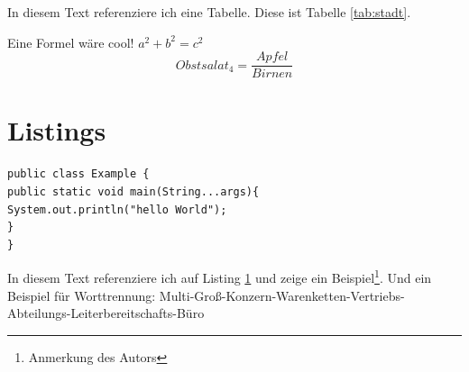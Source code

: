 \documentclass[]{scrreprt}
\begin{document}
In diesem Text referenziere ich eine Tabelle. Diese ist Tabelle \ref{tab:stadt}.

Eine Formel wäre cool! $a^2 + b^2 = c^2$
\[ Obstsalat_4 = \frac{Apfel}{Birnen} \]

\section{Listings}%
\label{meinCode}%
\begin{lstlisting}[caption=Example]
public class Example {
public static void main(String...args){
System.out.println("hello World");
}
}
\end{lstlisting}


In diesem Text referenziere ich auf Listing \ref{meinCode} und zeige ein Beispiel\footnote{Anmerkung des Autors}. Und ein Beispiel für Worttrennung: Multi-Groß-Konzern-Warenketten-Vertriebs-Abteilungs-Leiterbereit\-schafts-Büro
\end{document}
